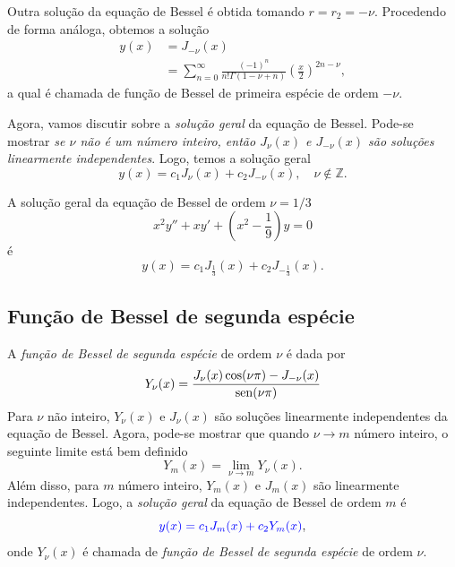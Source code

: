 Outra solução da equação de Bessel é obtida tomando $r=r_2=-\nu$. Procedendo de forma análoga, obtemos a solução
\begin{align}
  y(x) &= J_{-\nu}(x)\\
       &= \sum_{n=0}^\infty \frac{(-1)^n}{n!\Gamma(1-\nu+n)}\left(\frac{x}{2}\right)^{2n-\nu},
\end{align}
a qual é chamada de função de Bessel de primeira espécie de ordem $-\nu$.

Agora, vamos discutir sobre a \emph{solução geral} da equação de Bessel. Pode-se mostrar \emph{se $\nu$ não é um número inteiro, então $J_\nu(x)$ e $J_{-\nu}(x)$ são soluções linearmente independentes}. Logo, temos a solução geral
\begin{equation}
  y(x) = c_1J_\nu(x) + c_2J_{-\nu}(x),\quad \nu\not\in\mathbb{Z}.
\end{equation}

\begin{ex}
  A solução geral da equação de Bessel de ordem $\nu=1/3$
  \begin{equation}
    x^2y'' + xy' + \left(x^2 - \frac{1}{9}\right)y = 0
  \end{equation}
  é
  \begin{equation}
    y(x) = c_1J_{\frac{1}{3}}(x) + c_2J_{-\frac{1}{3}}(x).
  \end{equation}
\end{ex}

\subsection{Função de Bessel de segunda espécie}

A \emph{função de Bessel de segunda espécie} de ordem $\nu$ é dada por
\begin{equation}
  Y_\nu(x) = \frac{J_\nu(x)\cos(\nu\pi)-J_{-\nu}(x)}{\operatorname{sen}(\nu\pi)}
\end{equation}
Para $\nu$ não inteiro, $Y_\nu(x)$ e $J_\nu(x)$ são soluções linearmente independentes da equação de Bessel. Agora, pode-se mostrar que quando $\nu\to m$ número inteiro, o seguinte limite está bem definido
\begin{equation}
  Y_m(x) = \lim_{\nu\to m} Y_\nu(x).
\end{equation}
Além disso, para $m$ número inteiro, $Y_m(x)$ e $J_m(x)$ são linearmente independentes. Logo, a \emph{solução geral} da equação de Bessel de ordem $m$ é
\begin{equation}
  {\color{blue}y(x) = c_1J_m(x) + c_2Y_m(x)},
\end{equation}
onde $Y_\nu(x)$ é chamada de \emph{função de Bessel de segunda espécie} de ordem $\nu$.

